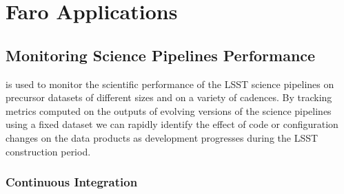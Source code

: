 \section{Faro Applications} \label{sec:applications}

\subsection{Monitoring Science Pipelines Performance} \label{ssec:monitoring}

\faro is used to monitor the scientific performance of the LSST science pipelines on precursor datasets of different sizes and on a variety of cadences\cite{dmtn-091}. 
By tracking metrics computed on the outputs of evolving versions of the science pipelines using a fixed dataset we can rapidly identify the effect of code or configuration changes on the data products as development progresses during the LSST construction period.

\subsubsection{Continuous Integration}\label{sssec:ci}

